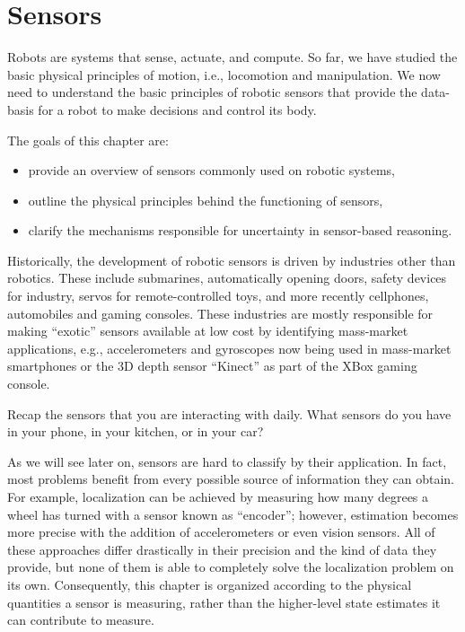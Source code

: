 \chapter{Sensors}\label{chap:sensors}
Robots are systems that sense, actuate, and compute. So far, we have studied the basic physical principles of motion, i.e., locomotion and manipulation. We now need to understand the basic principles of robotic sensors that provide the data-basis for a robot to make decisions and control its body.

The goals of this chapter are:
\begin{itemize}
\item provide an overview of sensors commonly used on robotic systems,
\item outline the physical principles behind the functioning of sensors,
\item clarify the mechanisms responsible for uncertainty in sensor-based reasoning.
\end{itemize}

Historically, the development of robotic sensors is driven by industries other than robotics. These include submarines, automatically opening doors, safety devices for industry, servos for remote-controlled toys, and more recently cellphones, automobiles and gaming consoles. These industries are mostly responsible for making ``exotic'' sensors available at low cost by identifying mass-market applications, e.g., accelerometers and gyroscopes now being used in mass-market smartphones or the 3D depth sensor ``Kinect'' as part of the XBox gaming console.

\begin{mdframed}
Recap the sensors that you are interacting with daily. What sensors do you have in your phone, in your kitchen, or in your car?
\end{mdframed}

As we will see later on, sensors are hard to classify by their application. In fact, most problems benefit from every possible source of information they can obtain. For example, localization can be achieved by measuring how many degrees a wheel has turned with a sensor known as ``encoder''; however, estimation becomes more precise with the addition of accelerometers or even vision sensors. All of these approaches differ drastically in their precision and the kind of data they provide, but none of them is able to completely solve the localization problem on its own.
Consequently, this chapter is organized according to the physical quantities a sensor is measuring, rather than the higher-level state estimates it can contribute to measure.

